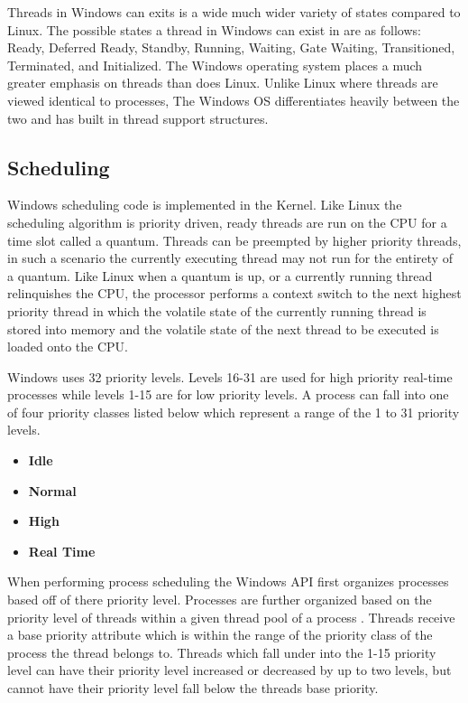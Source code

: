   \normalfont \indent Threads in Windows can exits is a wide much wider variety of states compared to Linux. The possible states a thread in Windows can exist in are as follows: Ready, Deferred Ready, Standby, Running, Waiting, Gate Waiting, Transitioned, Terminated, and Initialized. The Windows operating system places a much greater emphasis on threads than does Linux. Unlike Linux where threads are viewed identical to processes, The Windows OS differentiates heavily between the two and has built in thread support structures.

  \subsection{\bf Scheduling}
  \normalfont \indent Windows scheduling code is implemented in the Kernel. Like Linux the scheduling algorithm is priority driven, ready threads are run on the CPU for a time slot called a quantum.  Threads can be preempted by higher priority threads, in such a scenario the currently executing thread may not run for the entirety of a quantum. Like Linux when a quantum is up, or a currently running thread relinquishes the CPU, the processor performs a context switch to the next highest priority thread in which the volatile state of the currently running thread is stored into memory and the volatile state of the next thread to be executed is loaded onto the CPU.

  \normalfont \indent Windows uses 32 priority levels. Levels 16-31 are used for high priority real-time processes while levels 1-15 are for low priority levels. A process can fall into one of four priority classes listed below which represent a range of the 1 to 31 priority levels\cite{windowsInternals}.

        \begin{center}
        \begin{itemize}
                \item \textbf{Idle}
                \item \textbf{Normal}
                \item \textbf{High}
                \item \textbf{Real Time}
        \end{itemize}
        \end{center}

        \normalfont \indent When performing process scheduling the Windows API first organizes processes based off of there priority level. Processes are further organized based on the priority level of threads within a given thread pool of a process \cite{windowsInternals}. Threads receive a base priority attribute which is within the range of the priority class of the process the thread belongs to. Threads which fall under into the 1-15 priority level can have their priority level increased or decreased by up to two levels, but cannot have their priority level fall below the threads base priority.

